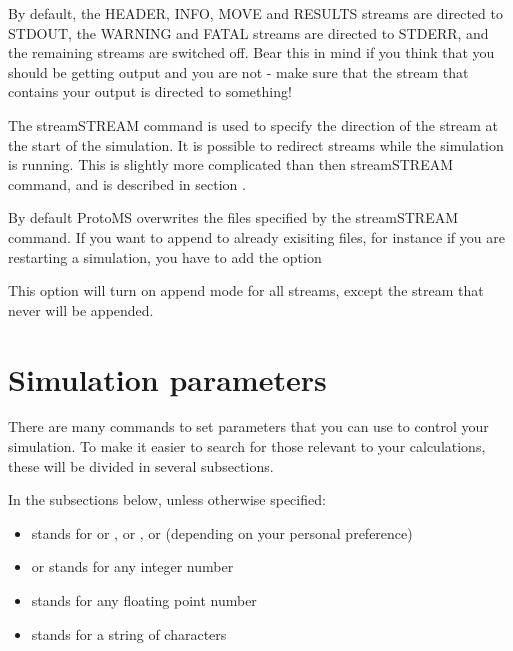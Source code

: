 \documentclass[letterpaper,10pt,english]{sphinxmanual}
\begin{document}
By default, the HEADER, INFO, MOVE and RESULTS streams are directed to STDOUT, the WARNING and FATAL streams are directed to STDERR, and the remaining streams are switched off. Bear this in mind if you think that you should be getting output and you are not - make sure that the stream that contains your output is directed to something!

The streamSTREAM command is used to specify the direction of the stream at the start of the simulation. It is possible to redirect streams while the simulation is running. This is slightly more complicated than then streamSTREAM command, and is described in section {\hyperref[\detokenize{protoms:misccmd}]{}}.

By default ProtoMS overwrites the files specified by the streamSTREAM command. If you want to append to already exisiting files, for instance if you are restarting a simulation, you have to add the option

%
\begin{sphinxVerbatim}[commandchars=\\\{\}]
 
\end{sphinxVerbatim}

This option will turn on append mode for all streams, except the  stream that never will be appended.


\section{Simulation parameters}
\label{\detokenize{protoms:parameters}}\label{\detokenize{protoms:simulation-parameters}}
There are many commands to set parameters that you can use to control your simulation. To make it easier to search for those relevant to your calculations, these will be divided in several subsections.

In the subsections below, unless otherwise specified:
\begin{itemize}
\item {} 
 stands for  or ,  or ,  or  (depending on your personal preference)

\item {} 
 or  stands for any integer number

\item {} 
 stands for any floating point number

\item {} 
 stands for a string of characters

\end{itemize}
\end{document}
